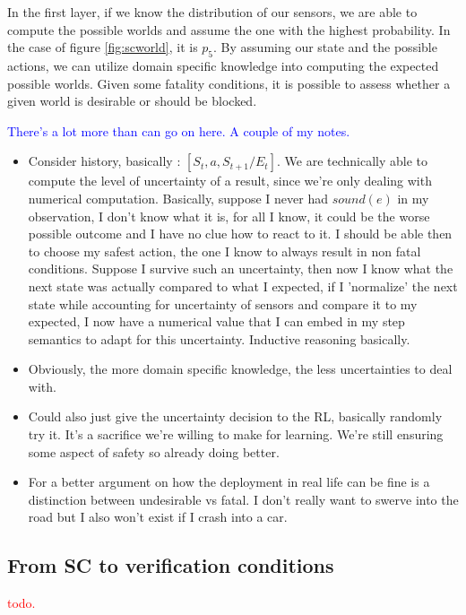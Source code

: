 \documentclass[a4paper,11pt]{article}
\begin{document}
In the first layer, if we know the distribution of our sensors, we are able to compute the possible worlds and assume the one with the highest probability.
In the case of figure \ref{fig:scworld}, it is $p_5$. By assuming our state and the possible actions, we can utilize domain specific knowledge into 
computing the expected possible worlds. Given some fatality conditions, it is possible to assess whether a given world is desirable or should be blocked. 

\textcolor{blue}{There's a lot more than can go on here. A couple of my notes.}
\begin{itemize}
  \item Consider history, basically : $[S_t, a, S_{t+1}/E_t]$. We are technically able to compute the level of uncertainty of a result, since
        we're only dealing with numerical computation. Basically, suppose I never had $sound(e)$ in my observation, I don't know what it is, for all I know, 
        it could be the worse possible outcome and I have no clue how to react to it. I should be able then to choose my safest action, the one I know to always result 
        in non fatal conditions. Suppose I survive such an uncertainty, then now I know what the next state was actually compared to what I expected,
        if I 'normalize' the next state while accounting for uncertainty of sensors and compare it to my expected, I now have a numerical value that 
        I can embed in my step semantics to adapt for this uncertainty. Inductive reasoning basically. 
  \item Obviously, the more domain specific knowledge, the less uncertainties to deal with.
  \item Could also just give the uncertainty decision to the RL, basically randomly try it. It's a sacrifice we're willing to make 
        for learning. We're still ensuring some aspect of safety so already doing better.
  \item For a better argument on how the deployment in real life can be fine is a distinction between 
        undesirable vs fatal. I don't really want to swerve into the road but I also won't exist if I crash into a car. 
\end{itemize}

\subsection{From SC to verification conditions} 
\textcolor{red}{todo.}
 
\end{document}
